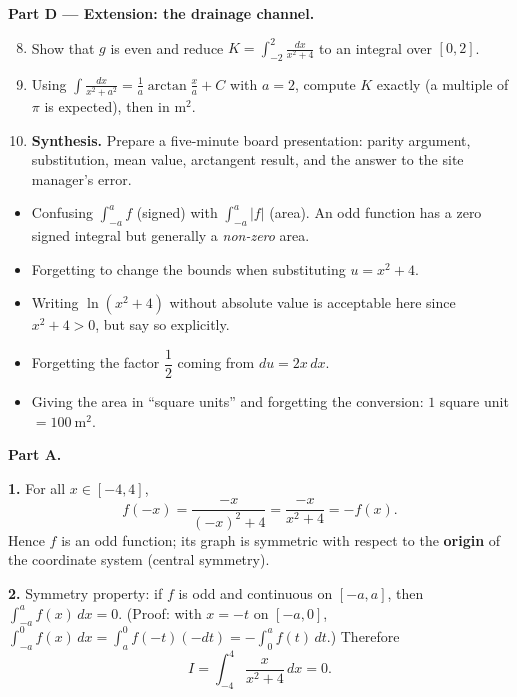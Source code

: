 \documentclass[11pt]{article}
\newcommand{\cle}[1]{{\popxbold\color{popdark}#1}}
\newcounter{popsec}
\newcounter{popsub}
\newcommand{\courssub}[1]{%
  \stepcounter{popsub}%
  \par\vspace{9pt}\noindent{\popxbold\fontsize{11.5}{13}\selectfont\color{popink}{\color{poporange}\thepopsec.\thepopsub}\hspace{6pt}#1}\par\nopagebreak\vspace{4pt}
}
\begin{document}
\textbf{Part D — Extension: the drainage channel.}

\begin{enumerate}
\setcounter{enumi}{7}
\item Show that $g$ is even and reduce $\displaystyle K=\int_{-2}^{2}\frac{dx}{x^2+4}$ to an integral over $[0,2]$.
\item Using $\displaystyle\int\frac{dx}{x^2+a^2} = \frac{1}{a}\arctan\frac{x}{a} + C$ with $a=2$, compute $K$ exactly (a multiple of $\pi$ is expected), then in $\mathrm{m}^2$.
\item \textbf{Synthesis.} Prepare a five-minute board presentation: parity argument, substitution, mean value, arctangent result, and the answer to the site manager's error.
\end{enumerate}

\begin{attention}
\begin{itemize}
\item Confusing $\displaystyle\int_{-a}^{a} f$ (signed) with $\displaystyle\int_{-a}^{a} |f|$ (area). An odd function has a zero signed integral but generally a \emph{non-zero} area.
\item Forgetting to change the bounds when substituting $u = x^2+4$.
\item Writing $\ln(x^2+4)$ without absolute value is acceptable here since $x^2+4>0$, but say so explicitly.
\item Forgetting the factor $\dfrac{1}{2}$ coming from $du = 2x\,dx$.
\item Giving the area in ``square units'' and forgetting the conversion: $1$ square unit $= 100\ \mathrm{m}^2$.
\end{itemize}
\end{attention}

\courssub{Model answer}

\textbf{Part A.}\par
\textbf{1.} For all $x\in[-4,4]$,
\[
f(-x) = \frac{-x}{(-x)^2+4} = \frac{-x}{x^2+4} = -f(x).
\]
Hence $f$ is an \cle{odd function}; its graph is symmetric with respect to the \textbf{origin} of the coordinate system (central symmetry).

\textbf{2.} Symmetry property: if $f$ is odd and continuous on $[-a,a]$, then $\displaystyle\int_{-a}^{a} f(x)\,dx = 0$. (Proof: with $x=-t$ on $[-a,0]$, $\int_{-a}^{0}f(x)\,dx = \int_{a}^{0}f(-t)(-dt) = -\int_{0}^{a}f(t)\,dt$.) Therefore
\[
I = \int_{-4}^{4}\frac{x}{x^2+4}\,dx = 0.
\]
\end{document}
